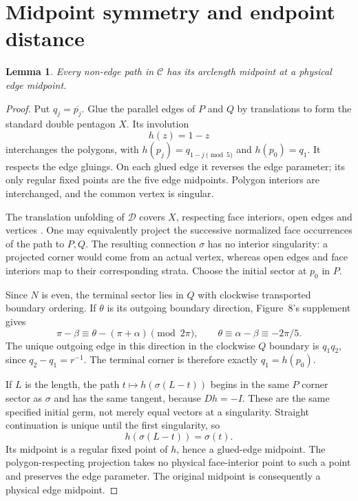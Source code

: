 \documentclass[11pt]{amsart}
\newtheorem{lemma}[theorem]{Lemma}
\theoremstyle{remark}
\newcommand{\D}{\mathcal D}
\newcommand{\C}{\mathcal C}
\begin{document}
\section{Midpoint symmetry and endpoint distance}
\begin{lemma}\label{midpoint}
Every non-edge path in $\C$ has its arclength midpoint at a physical edge midpoint.
\end{lemma}
\begin{proof}
Put $q_j=\overline{p_j}$. Glue the parallel edges of $P$ and $Q$ by translations to form the standard double pentagon $X$. Its involution
\[
                       h(z)=1-z
\]
interchanges the polygons, with $h(p_j)=q_{1-j\pmod5}$ and $h(p_0)=q_1$. It respects the edge gluings. On each glued edge it reverses the edge parameter; its only regular fixed points are the five edge midpoints. Polygon interiors are interchanged, and the common vertex is singular.

The translation unfolding of $\D$ covers $X$, respecting face interiors, open edges and vertices \cite[Proposition~4.4 and Theorem~4.5]{AAH}. One may equivalently project the successive normalized face occurrences of the path to $P,Q$. The resulting connection $\sigma$ has no interior singularity: a projected corner would come from an actual vertex, whereas open edges and face interiors map to their corresponding strata. Choose the initial sector at $p_0$ in $P$.

Since $N$ is even, the terminal sector lies in $Q$ with clockwise transported boundary ordering. If $\theta$ is its outgoing boundary direction, Figure~8's supplement gives
\[
       \pi-\beta\equiv\theta-(\pi+\alpha)\pmod{2\pi},
       \qquad \theta\equiv\alpha-\beta\equiv-2\pi/5.
\]
The unique outgoing edge in this direction in the clockwise $Q$ boundary is $q_1q_2$, since $q_2-q_1=r^{-1}$. The terminal corner is therefore exactly $q_1=h(p_0)$.

If $L$ is the length, the path $t\mapsto h(\sigma(L-t))$ begins in the same $P$ corner sector as $\sigma$ and has the same tangent, because $Dh=-I$. These are the same specified initial germ, not merely equal vectors at a singularity. Straight continuation is unique until the first singularity, so
\[
                         h(\sigma(L-t))=\sigma(t).
\]
Its midpoint is a regular fixed point of $h$, hence a glued-edge midpoint. The polygon-respecting projection takes no physical face-interior point to such a point and preserves the edge parameter. The original midpoint is consequently a physical edge midpoint.
\end{proof}
\end{document}
